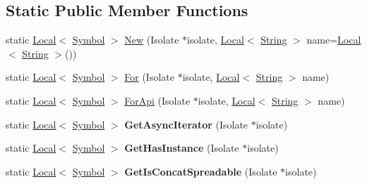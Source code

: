 \subsection*{Static Public Member Functions}
\begin{DoxyCompactItemize}
\item 
static \mbox{\hyperlink{classv8_1_1Local}{Local}}$<$ \mbox{\hyperlink{classv8_1_1Symbol}{Symbol}} $>$ \mbox{\hyperlink{classv8_1_1Symbol_add1f6084974464105b56595d34c14ab9}{New}} (Isolate $\ast$isolate, \mbox{\hyperlink{classv8_1_1Local}{Local}}$<$ \mbox{\hyperlink{classv8_1_1String}{String}} $>$ name=\mbox{\hyperlink{classv8_1_1Local}{Local}}$<$ \mbox{\hyperlink{classv8_1_1String}{String}} $>$())
\item 
static \mbox{\hyperlink{classv8_1_1Local}{Local}}$<$ \mbox{\hyperlink{classv8_1_1Symbol}{Symbol}} $>$ \mbox{\hyperlink{classv8_1_1Symbol_a8a4a6bdc7d3e31c71cf48fa5cb811fc8}{For}} (Isolate $\ast$isolate, \mbox{\hyperlink{classv8_1_1Local}{Local}}$<$ \mbox{\hyperlink{classv8_1_1String}{String}} $>$ name)
\item 
static \mbox{\hyperlink{classv8_1_1Local}{Local}}$<$ \mbox{\hyperlink{classv8_1_1Symbol}{Symbol}} $>$ \mbox{\hyperlink{classv8_1_1Symbol_ac3937f0b0b831c4be495a399f26d7301}{For\+Api}} (Isolate $\ast$isolate, \mbox{\hyperlink{classv8_1_1Local}{Local}}$<$ \mbox{\hyperlink{classv8_1_1String}{String}} $>$ name)
\item 
\mbox{\label{classv8_1_1Symbol_a9ce03e853ed34c0192bef63d88d2f9c6}} 
static \mbox{\hyperlink{classv8_1_1Local}{Local}}$<$ \mbox{\hyperlink{classv8_1_1Symbol}{Symbol}} $>$ {\bfseries Get\+Async\+Iterator} (Isolate $\ast$isolate)
\item 
\mbox{\label{classv8_1_1Symbol_ad23ee69f0680db333469272554b07a6e}} 
static \mbox{\hyperlink{classv8_1_1Local}{Local}}$<$ \mbox{\hyperlink{classv8_1_1Symbol}{Symbol}} $>$ {\bfseries Get\+Has\+Instance} (Isolate $\ast$isolate)
\item 
\mbox{\label{classv8_1_1Symbol_acf0d506838dbf518537c17a72571c0bf}} 
static \mbox{\hyperlink{classv8_1_1Local}{Local}}$<$ \mbox{\hyperlink{classv8_1_1Symbol}{Symbol}} $>$ {\bfseries Get\+Is\+Concat\+Spreadable} (Isolate $\ast$isolate)
\item 
\mbox{\label{classv8_1_1Symbol_a35aa1aca7135c5bf9052d8d067d126b1}} 

\end{DoxyCompactItemize}

